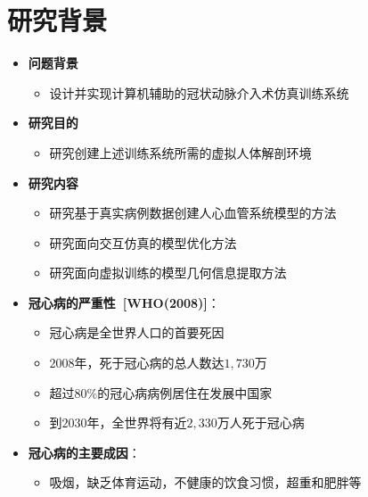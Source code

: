 \section{研究背景}

\begin{frame}
\begin{itemize}
\item \textbf{问题背景}
\begin{itemize}
\item 设计并实现计算机辅助的冠状动脉介入术仿真训练系统
\end{itemize}
\end{itemize}
\begin{itemize}
\pause \item \textbf{研究目的}
\begin{itemize}
\item 研究创建上述训练系统所需的虚拟人体解剖环境
\end{itemize}
\end{itemize}
\begin{itemize}
\pause \item \textbf{研究内容}
\begin{itemize}
\item 研究基于真实病例数据创建人心血管系统模型的方法
\item 研究面向交互仿真的模型优化方法
\item 研究面向虚拟训练的模型几何信息提取方法
\end{itemize}
\end{itemize}
\end{frame}

\begin{frame}
\begin{itemize}
\item \textbf{冠心病的严重性~[WHO(2008)]}：
\begin{itemize}
\pause \item 冠心病是全世界人口的首要死因
\item $2008$年，死于冠心病的总人数达$1,730$万
\item 超过$80 \%$的冠心病病例居住在发展中国家
\item 到$2030$年，全世界将有近$2,330$万人死于冠心病
\end{itemize}
\end{itemize}
\begin{itemize}
\pause \item \textbf{冠心病的主要成因}：
\begin{itemize}
\item 吸烟，缺乏体育运动，不健康的饮食习惯，超重和肥胖等
\end{itemize}
\end{itemize}
\end{frame}

